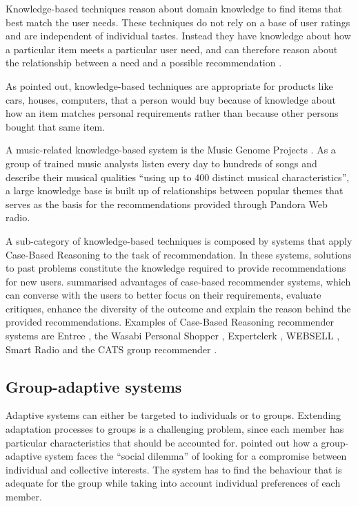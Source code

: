 Knowledge-based techniques reason about domain knowledge to find items that best match the user needs.
These techniques do not rely on a base of user ratings and are independent of individual tastes.
Instead they have knowledge about how a particular item meets a particular user need, and can therefore reason about the relationship between a need and a possible recommendation \cite{Burke00}.


As \citet{Chun01} pointed out, knowledge-based techniques are appropriate for products like cars, houses, computers, that a person would buy because of knowledge about how an item matches personal requirements rather than because other persons bought that same item.

A music-related knowledge-based system is the Music Genome Projects \cite{Pandora06}.
As a group of trained music analysts listen every day to hundreds of songs and describe their musical qualities ``using up to 400 distinct musical characteristics'', a large knowledge base is built up of relationships between popular themes that serves as the basis for the recommendations provided through Pandora Web radio. %

A sub-category of knowledge-based techniques is composed by %
systems that apply Case-Based Reasoning to the task of recommendation.
In these systems, solutions to past problems constitute the knowledge required to provide recommendations for new users.
\citet{Smyth07} summarised advantages of case-based recommender systems, which can converse with the users to better focus on their requirements, evaluate critiques, enhance the diversity of the outcome and explain the reason behind the provided recommendations.
Examples of Case-Based Reasoning recommender systems are Entree \cite{Burke97}, the Wasabi Personal Shopper \cite{Burke99}, Expertclerk \cite{Shimazu01}, WEBSELL \cite{Cunningham01}, Smart Radio \cite{Hayes01b} and the CATS group recommender \cite{McCarthy06b}.




\subsection{Group-adaptive systems} %
\label{sub:group_adaptive_systems}

Adaptive systems can either be targeted to individuals or to groups.
Extending adaptation processes to groups is a challenging problem, since each member has particular characteristics that should be accounted for. 
\citet{Messick83} pointed out how a group-adaptive system faces the ``social dilemma''  of looking for a compromise between individual and collective interests. 
The system has to find the behaviour that is adequate for the group while taking into account individual preferences of each member.

